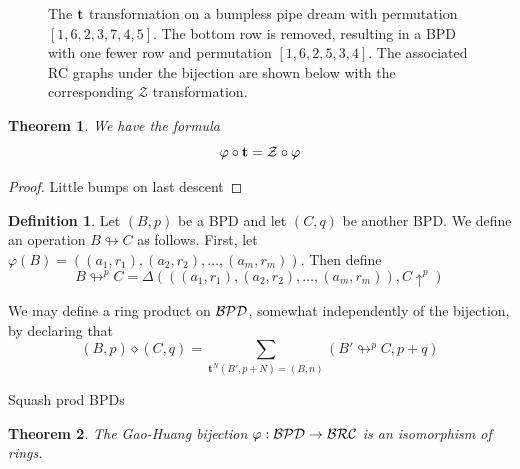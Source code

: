 \documentclass{amsart}
\newtheorem{theorem}{Theorem}[section]
\theoremstyle{definition}
\newtheorem{definition}[lemma]{Definition}
\theoremstyle{remark}
\numberwithin{equation}{subsection}
\newcommand{\shup}{{\uparrow}}
\newcommand{\zeromap}{\mathcal{Z}}
\begin{document}
\begin{figure}[htbp]
\caption{The $\mathbf{t}$ transformation on a bumpless pipe dream with permutation $[1,6,2,3,7,4,5]$. The bottom row is removed, resulting in a BPD with one fewer row and permutation $[1,6,2,5,3,4]$. The associated RC graphs under the bijection are shown below with the corresponding $\zeromap$ transformation.} 
\label{figure:transition}
\end{figure}

\begin{theorem}
We have the formula
$$\varphi\circ \bzeromap = \zeromap \circ \varphi$$
\end{theorem}
\begin{proof}
Little bumps on last descent
\end{proof}

\begin{definition}
Let $(B, p)$ be a BPD and let $(C, q)$ be another BPD. We define an operation $B\looparrowright C$ as follows. First, let $\varphi(B) = ((a_1, r_1), (a_2, r_2), \ldots, (a_m, r_m))$. Then define
$$B\looparrowright^p C = \Delta(((a_1, r_1), (a_2, r_2), \ldots, (a_m, r_m)),C\shup^p)$$

We may define a ring product on $\mathcal{BPD}$, somewhat independently of the bijection, by declaring that 
$$(B, p)\diamond (C, q) = \sum_{\mathbf{t}^N(B', p + N) = (B,n)} (B'\looparrowright^p C, p+q)$$
\end{definition}



Squash prod BPDs



\begin{theorem}
The Gao-Huang bijection $\varphi:\mathcal{BPD} \to \mathcal{BRC}$ is an isomorphism of rings.
\end{theorem}
\end{document}

